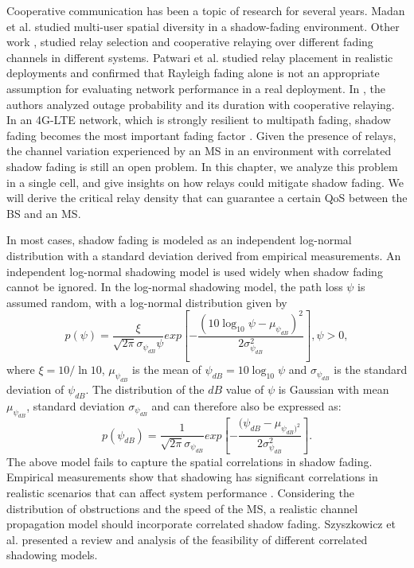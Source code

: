 \par Cooperative communication has been a topic of research for several years. Madan et al. \cite{madan2008energy} studied multi-user spatial diversity in a shadow-fading environment. Other work \cite{emamian2002multi,kasiri2008new,park2011opportunistic}, studied relay selection and cooperative relaying over different fading channels in different systems. Patwari et al. \cite{bletsas2006outage} studied relay placement in realistic deployments and confirmed that Rayleigh fading alone is not an appropriate assumption for evaluating network performance in a real deployment. In \cite{zlatanov2011average, kaltakis2009uplink}, the authors analyzed outage probability and its duration with cooperative relaying. In an 4G-LTE network, which is strongly resilient to multipath fading, shadow fading becomes the most important fading factor \cite{rappaport1996wireless}. Given the presence of relays, the channel variation experienced by an MS in an environment with correlated shadow fading is still an open problem. In this chapter, we analyze this problem in a single cell, and give insights on how relays could mitigate shadow fading. We will derive the critical relay density that can guarantee a certain QoS between the BS and an MS.
\par In most cases, shadow fading is modeled as an independent log-normal distribution \cite{goldsmith2005wireless} with a standard deviation derived from empirical measurements. An independent log-normal shadowing model is used widely when shadow fading cannot be ignored. In the log-normal shadowing model, the path loss $\psi$ is assumed random, with a log-normal distribution given by
\begin{equation}
p(\psi)=\frac{\xi}{\sqrt{2\pi}\sigma_{\psi_{dB}}\psi}exp[-\frac{(10\log_{10}\psi-\mu_{\psi_{dB}})^{2}}{2\sigma_{\psi_{dB}}^{2}}], \psi>0,
\end{equation}
where $\xi=10/\ln10$, $\mu_{\psi_{dB}}$ is the mean of $\psi_{dB}=10\log_{10}\psi$ and $\sigma_{\psi_{dB}}$ is the standard deviation of $\psi_{dB}$.
The distribution of the $dB$ value of $\psi$ is Gaussian with mean $\mu_{\psi_{dB}}$, standard deviation $\sigma_{\psi_{dB}}$ and can therefore also be expressed as:
\begin{equation}
p(\psi_{dB})=\frac{1}{\sqrt{2\pi}\sigma_{\psi_{dB}}}exp[-\frac{(\psi_{dB}-\mu_{\psi_{dB})^2}}{2\sigma_{\psi_{dB}}^2}].
\end{equation}
The above model fails to capture the spatial correlations in shadow fading. Empirical measurements show that shadowing has significant correlations in realistic scenarios that can affect system performance \cite{graziano1978propagation}. Considering the distribution of obstructions and the speed of the MS, a realistic channel propagation model should incorporate correlated shadow fading.  Szyszkowicz et al. \cite{szyszkowicz2010feasibility} presented a review and analysis of the feasibility of different correlated shadowing models.

